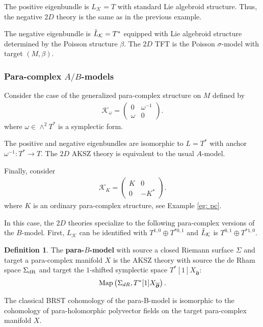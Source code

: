 \documentclass[letterpaper,12pt]{article}
\newcommand{\KK}{\mathcal{K}}
\newcommand{\p}{\partial}
\newcommand{\pd}{\overline{\bm{\p}}}
\theoremstyle{definition}
\newtheorem{Def}[theorem]{Definition}
\theoremstyle{remark}
\theoremstyle{examples}
\begin{document}
The positive eigenbundle is $L_{\KK} = T$ with standard Lie algebroid structure. 
Thus, the negative $2D$ theory is the same as in the previous example.

The negative eigenbundle is $\Tilde{L}_\KK = T^*$ equipped with Lie algebroid structure determined by the Poisson structure $\beta$. 
The $2D$ TFT is the Poisson $\sigma$-model with target $(M, \beta)$. 

\subsubsection*{Para-complex $A/B$-models}
Consider the case of the generalized para-complex structure on $M$ defined by
\begin{align*}
\KK_\omega =
\begin{pmatrix}
0 & \omega^{-1} \\
\omega & 0
\end{pmatrix}.
\end{align*}
where $\omega \in \wedge^2 T^*$ is a symplectic form.

The positive and negative eigenbundles are isomorphic to $L = T^*$ with anchor $\omega^{-1} : T^* \to T$. 
The $2D$ AKSZ theory is equivalent to the usual $A$-model. 

Finally, consider 
\begin{align*}
\KK_K =
\begin{pmatrix}
K & 0 \\
0 & -K^*
\end{pmatrix}.
\end{align*}
where $K$ is an ordinary para-complex structure, see Example \ref{eg: pc}. 

In this case, the $2D$ theories specialize to the following para-complex versions of the $B$-model.
First, $L_{\KK}$ can be identified with $T^{1,0} \oplus T^{*0,1}$ and $\Tilde{L}_{\KK}$ is $T^{0,1} \oplus T^{*1,0}$. 

\begin{Def}
The {\bf para-$B$-model} with source a closed Riemann surface $\Sigma$ and target a para-complex manifold $X$ is the AKSZ theory with source the de Rham space $\Sigma_{\rm dR}$ and target the $1$-shifted symplectic space $T^*[1] X_{\pd}$:
\[
{\rm Map}\left(\Sigma_{dR}, T^*[1]  X_{\pd}\right) .
\]
\end{Def}

The classical BRST cohomology of the para-B-model is isomorphic to the cohomology of para-holomorphic polyvector fields on the target para-complex manifold $X$.
\end{document}

